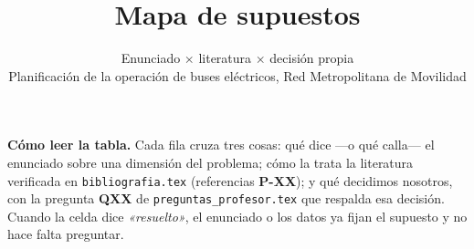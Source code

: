 \documentclass[11pt,a4paper,parskip=half]{scrartcl}
\title{Mapa de supuestos}
\subtitle{\normalsize Enunciado $\times$ literatura $\times$ decisión propia\\[2pt]
Planificación de la operación de buses eléctricos, Red Metropolitana de Movilidad}
\author{}
\date{}
\begin{document}
\maketitle
\vspace{-2.2\baselineskip}

\begin{nota}
\textbf{\textcolor{ink}{Cómo leer la tabla.}} Cada fila cruza tres cosas: qué dice —o qué calla— el enunciado sobre una dimensión del problema; cómo la trata la literatura verificada en \texttt{bibliografia.tex} (referencias \textbf{P-XX}); y qué decidimos nosotros, con la pregunta \textbf{QXX} de \texttt{preguntas\_profesor.tex} que respalda esa decisión. Cuando la celda dice \textit{«resuelto»}, el enunciado o los datos ya fijan el supuesto y no hace falta preguntar.
\end{nota}
\end{document}
